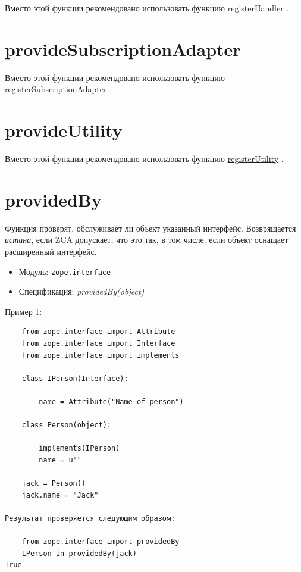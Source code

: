 \documentclass[a4paper,openany,twoside,final]{book}
\providecommand*{\DUroletitlereference}[1]{\textsl{#1}}
\begin{document}
Вместо этой функции рекомендовано использовать функцию \hyperref[registerhandler]{registerHandler} .


\section*{provideSubscriptionAdapter%
  \label{providesubscriptionadapter}%
}

Вместо этой функции рекомендовано использовать функцию \hyperref[registersubscriptionadapter]{registerSubscriptionAdapter} .


\section*{provideUtility%
  \label{provideutility}%
}

Вместо этой функции рекомендовано использовать функцию \hyperref[registerutility]{registerUtility} .


\section*{providedBy%
  \label{providedby}%
}

Функция проверят, обслуживает ли объект указанный интерфейс.  Возврящается \DUroletitlereference{истина}, если ZCA допускает, что это так, в том числе, если объект оснащает расширенный интерфейс.

\begin{itemize}

\item Модуль: \texttt{zope.interface}

\item Спецификация: \DUroletitlereference{providedBy(object)}

\end{itemize}

Пример 1:

\begin{verbatim}
    from zope.interface import Attribute
    from zope.interface import Interface
    from zope.interface import implements

    class IPerson(Interface):

        name = Attribute("Name of person")

    class Person(object):

        implements(IPerson)
        name = u""

    jack = Person()
    jack.name = "Jack"

Результат проверяется следующим образом:

    from zope.interface import providedBy
    IPerson in providedBy(jack)
True
\end{verbatim}
\end{document}

